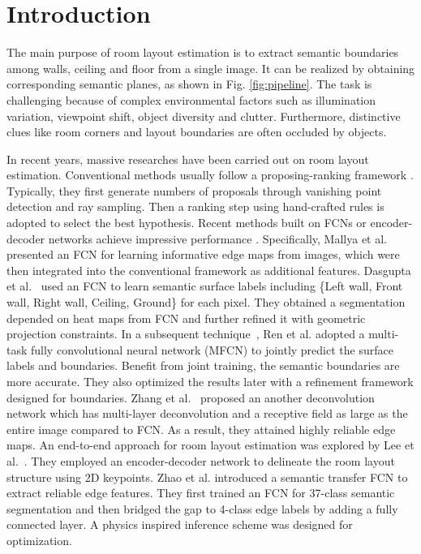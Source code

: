 \section{Introduction}
\label{sec:intro}

The main purpose of room layout estimation is to extract semantic boundaries among walls, ceiling and floor from a single image. It can be realized by obtaining corresponding semantic planes, as shown in Fig. \ref{fig:pipeline}. The task is challenging because of complex environmental factors such as illumination variation, viewpoint shift, object diversity and clutter. Furthermore, distinctive clues like room corners and layout boundaries are often occluded by objects. 

In recent years, massive researches have been carried out on room layout estimation. Conventional methods usually follow a proposing-ranking framework \cite{hedau2009recovering,wang2013discriminative,gupta2010estimating,hedau2010thinking}. Typically, they first generate numbers of proposals through vanishing point detection and ray sampling. Then a ranking step using hand-crafted rules is adopted to select the best hypothesis. Recent methods built on FCNs \cite{long2015fully} or encoder-decoder networks achieve impressive performance \cite{mallya2015learning,ren2016coarse,zhang2017learning,dasgupta2016delay,LeeRoomNet17,zhao2017physics}. Specifically, 
%
Mallya et al.~\cite{mallya2015learning} presented an FCN for learning informative edge maps from images, which were then integrated into the conventional framework as additional features. 
%
Dasgupta et al.~\cite{dasgupta2016delay} used an FCN to learn semantic surface labels including \{Left wall, Front wall, Right wall, Ceiling, Ground\} for each pixel. They obtained a segmentation depended on heat maps from FCN and further refined it with geometric projection constraints.
% 
In a subsequent technique~\cite{ren2016coarse}, Ren et al. adopted a multi-task fully convolutional neural network (MFCN) to jointly predict the surface labels and boundaries. Benefit from joint training, the semantic boundaries are more accurate. They also optimized the results later with a refinement framework designed for boundaries.
% 
Zhang et al.~\cite{zhang2017learning} proposed an another deconvolution network which has multi-layer deconvolution and a receptive field as large as the entire image compared to FCN. As a result, they attained highly reliable edge maps. 
%
An end-to-end approach for room layout estimation was explored by Lee et al.~\cite{LeeRoomNet17}. They employed an encoder-decoder network to delineate the room layout structure using 2D keypoints.
%
Zhao et al. \cite{zhao2017physics} introduced a semantic transfer FCN to extract reliable edge features. They first trained an FCN for 37-class semantic segmentation and then bridged the gap to 4-class edge labels by adding a fully connected layer. A physics inspired inference scheme was designed for optimization.


